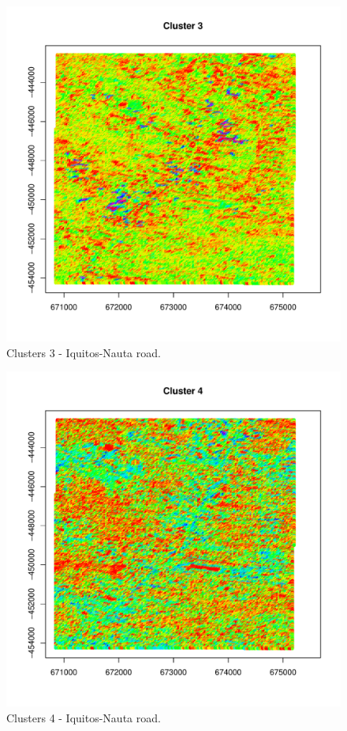 \documentclass[article]{jss}
\begin{document}
\begin{figure}
    \includegraphics[width=\linewidth, height=0.85\textheight]{plot0023.pdf}
    \caption{Clusters 3 - Iquitos-Nauta road.}
    \label{figure:cluster3}
\end{figure}

\begin{figure}
    \includegraphics[width=\linewidth, height=0.85\textheight]{plot0024.pdf}
    \caption{Clusters 4 - Iquitos-Nauta road.}
    \label{figure:cluster4}
\end{figure}
\end{document}
